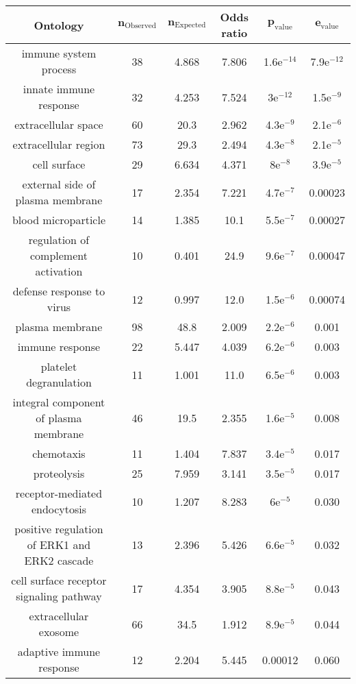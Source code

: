 \documentclass{article}
\begin{document}
\begin{table*}[hb!]
\centering
\begin{adjustbox}{width = 1\textwidth}
\small
\begin{tabular}{|c|c|c|c|c|c|}
	\hline
	\textbf{Ontology} & $\bm{n_{\mathrm{Observed}}}$ & $\bm{n_{\mathrm{Expected}}}$ & \textbf{Odds ratio} & $\bm{p_{\mathrm{value}}}$ & $\bm{e_{\mathrm{value}}}$		\\
	\hline
	immune system process & 38 & 4.868 & 7.806 & 1.6e$^{-14}$ & 7.9e$^{-12}$ \\
	innate immune response & 32 & 4.253 & 7.524 & 3e$^{-12}$ & 1.5e$^{-9}$ \\
	extracellular space & 60 & 20.3 & 2.962 & 4.3e$^{-9}$ & 2.1e$^{-6}$ \\
	extracellular region & 73 & 29.3 & 2.494 & 4.3e$^{-8}$ & 2.1e$^{-5}$ \\
	cell surface & 29 & 6.634 & 4.371 & 8e$^{-8}$ & 3.9e$^{-5}$ \\
	external side of plasma membrane & 17 & 2.354 & 7.221 & 4.7e$^{-7}$ & 0.00023 \\
	blood microparticle & 14 & 1.385 & 10.1 & 5.5e$^{-7}$ & 0.00027 \\
	regulation of complement activation & 10 & 0.401 & 24.9 & 9.6e$^{-7}$ & 0.00047 \\
	defense response to virus & 12 & 0.997 & 12.0 & 1.5e$^{-6}$ & 0.00074 \\
	plasma membrane & 98 & 48.8 & 2.009 & 2.2e$^{-6}$ & 0.001 \\
	immune response & 22 & 5.447 & 4.039 & 6.2e$^{-6}$ & 0.003 \\
	platelet degranulation & 11 & 1.001 & 11.0 & 6.5e$^{-6}$ & 0.003 \\
	integral component of plasma membrane & 46 & 19.5 & 2.355 & 1.6e$^{-5}$ & 0.008 \\
	chemotaxis & 11 & 1.404 & 7.837 & 3.4e$^{-5}$ & 0.017 \\
	proteolysis & 25 & 7.959 & 3.141 & 3.5e$^{-5}$ & 0.017 \\
	receptor-mediated endocytosis & 10 & 1.207 & 8.283 & 6e$^{-5}$ & 0.030 \\
	positive regulation of ERK1 and ERK2 cascade & 13 & 2.396 & 5.426 & 6.6e$^{-5}$ & 0.032 \\
	cell surface receptor signaling pathway & 17 & 4.354 & 3.905 & 8.8e$^{-5}$ & 0.043 \\
	extracellular exosome & 66 & 34.5 & 1.912 & 8.9e$^{-5}$ & 0.044 \\
	adaptive immune response & 12 & 2.204 & 5.445 & 0.00012 & 0.060 \\

\end{tabular}
\end{adjustbox}
\end{table*}
\end{document}
